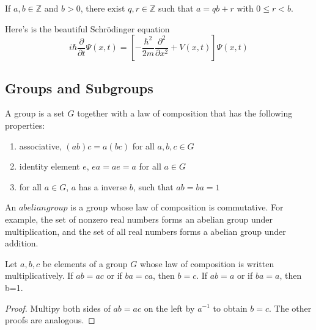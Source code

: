 \documentclass{tufte-handout}
\newcommand{\Z}{\mathbb{Z}}
\begin{document}
\begin{lemma}
	If $a,b \in \Z$ and $b>0$, there exist $q,r\in \Z$ such that $a=qb+r$ with $0\le r < b$.
\end{lemma}


\begin{definition}
\lipsum[1][0-10]
\end{definition}

\begin{definition}%
	Here's is the beautiful Schr\"odinger equation
	\[ i\hbar {\frac {\partial }{\partial t}}\Psi (x,t)=
	\left[-{\frac {\hbar ^{2}}{2m}}{\frac {\partial ^{2}}{\partial x^{2}}}+V(x,t)\right]\Psi (x,t)\]
\end{definition}

\subsection{Groups and Subgroups}

A group is a set $G$ together with a law of composition that has the following properties:

\begin{enumerate}
	\item associative, $(ab)c=a(bc)$ for all $a,b,c\in G$
	\item identity element $e$, $ea=ae=a$ for all $a\in G$
	\item for all $a\in G$, $a$ has a inverse $b$, such that $ab=ba=1$
\end{enumerate}

An $abelian group$ is a group whose law of composition is commutative. For example, the set of nonzero real numbers forms an abelian group under multiplication, and the set of all real numbers forms a abelian group under addition.

\begin{proposition}
	Let $a,b,c$ be elements of a group $G$ whose law of composition is written multiplicatively. If $ab=ac$ or if $ba=ca$, then $b=c$. If $ab=a$ or if $ba=a$, then b=1.
\end{proposition}

\begin{proof}
	Multipy both sides of $ab=ac$ on the left by $a^{-1}$ to obtain $b=c$. The other proofs are analogous. 
\end{proof}
\end{document}
